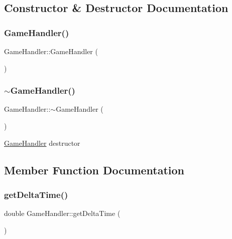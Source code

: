 \subsection{Constructor \& Destructor Documentation}
\mbox{\label{class_game_handler_ad016ced8da1d660009e014a9aeb833da}} 
\subsubsection{\texorpdfstring{Game\+Handler()}{GameHandler()}}
{\footnotesize\ttfamily Game\+Handler\+::\+Game\+Handler (\begin{DoxyParamCaption}{ }\end{DoxyParamCaption})}

\mbox{\label{class_game_handler_a37e9acdced835f48a2bb2a00cb322635}} 
\subsubsection{\texorpdfstring{$\sim$\+Game\+Handler()}{~GameHandler()}}
{\footnotesize\ttfamily Game\+Handler\+::$\sim$\+Game\+Handler (\begin{DoxyParamCaption}{ }\end{DoxyParamCaption})}



\mbox{\hyperlink{class_game_handler}{Game\+Handler}} destructor 



\subsection{Member Function Documentation}
\mbox{\label{class_game_handler_aebe798f7fee6c05c05bec6540f240238}} 
\subsubsection{\texorpdfstring{get\+Delta\+Time()}{getDeltaTime()}}
{\footnotesize\ttfamily double Game\+Handler\+::get\+Delta\+Time (\begin{DoxyParamCaption}{ }\end{DoxyParamCaption})\hspace{0.3cm}{\ttfamily [static]}}



